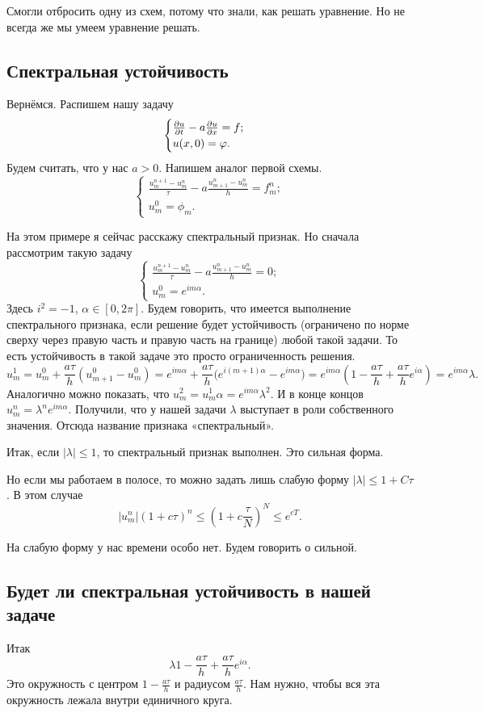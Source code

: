 Смогли отбросить одну из схем, потому что знали, как решать уравнение. Но не всегда же мы умеем уравнение решать.

\subsection{Спектральная устойчивость}
Вернёмся. Распишем нашу задачу
\[
\begin{cases}
  \frac{\partial u}{\partial t} - a\frac{\partial u}{\partial x} = f;\\
   u(x,0) = \varphi.
\end{cases}
\]
Будем считать, что у нас $a>0$. Напишем аналог первой схемы.
\[
\begin{cases}
  \frac{u_m^{n+1} - u_m^n}{\tau} - a\frac{u_{m+1}^n - u_m^n}{h} = f_m^n;\\
  u_m^0 = \phi_m.
\end{cases}
\]

На этом примере я сейчас расскажу спектральный признак. Но сначала рассмотрим такую задачу
\[
\begin{cases}
  \frac{u_m^{n+1} - u_m^n}{\tau} - a\frac{u_{m+1}^n - u_m^n}{h} = 0;\\
  u_m^0 = e^{im\alpha}.
\end{cases}
\]
Здесь $i^2 = -1$, $\alpha\in[0,2\pi]$. Будем говорить, что имеется выполнение спектрального признака, если решение будет устойчивость (ограничено по норме сверху через правую часть и правую часть на границе) любой такой задачи. То есть устойчивость в такой задаче это просто ограниченность решения.
\[
  u^1_m = u_m^0 + \frac{a\tau}{h}(u_{m+1}^0 - u_m^0) = e^{im\alpha} + \frac{a\tau}h\big(e^{i(m+1)\alpha} - e^{im\alpha}\big) = e^{im\alpha}\left( 1 - \frac{a\tau}h + \frac{a\tau}he^{i\alpha} \right) = e^{im\alpha}\lambda.
\]
Аналогично можно показать, что $u_m^2 = u_m^1 \alpha = e^{im\alpha}\lambda^2$. И в конце концов $u_m^n= \lambda^n e^{im\alpha}$. Получили, что у нашей задачи $\lambda$ выступает в роли собственного значения. Отсюда название признака «спектральный».

Итак, если $|\lambda|\le 1$, то спектральный признак выполнен. Это сильная форма.

Но если мы работаем в полосе, то можно задать лишь слабую форму $|\lambda|\le 1+ C\tau$. В этом случае
\[
  |u_m^n| (1 + c\tau)^n\le \left( 1 + c\frac\tau N \right)^N\le e^{cT}.
\]

На слабую форму у нас времени особо нет. Будем говорить о сильной.
\subsection{Будет ли спектральная устойчивость в нашей задаче}
Итак
\[
  \lambda 1 - \frac{a\tau}h + \frac{a\tau}h e^{i\alpha}.
\]
Это окружность с центром $1 - \frac{a\tau}h$ и радиусом $\frac{a\tau}h$. Нам нужно, чтобы вся эта окружность лежала внутри единичного круга.

